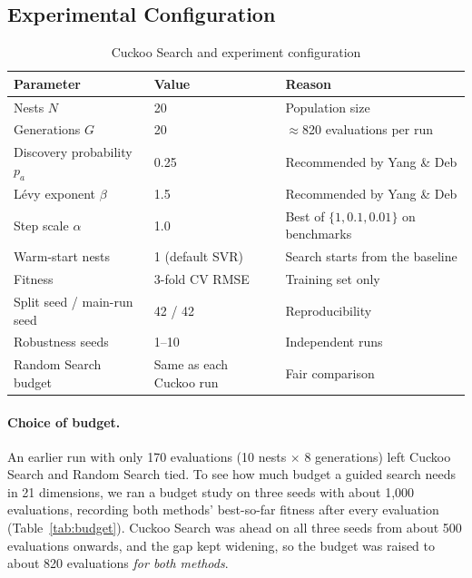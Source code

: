 \documentclass[12pt,a4paper]{article}
\numberwithin{equation}{section}
\numberwithin{table}{section}
\numberwithin{figure}{section}
\begin{document}
\subsection{Experimental Configuration}
\begin{table}[H]
\centering
\caption{Cuckoo Search and experiment configuration}
\label{tab:config}
\small
\begin{tabular}{@{}lll@{}}
\toprule
\textbf{Parameter} & \textbf{Value} & \textbf{Reason} \\ \midrule
Nests $N$ & 20 & Population size \\
Generations $G$ & 20 & $\approx$820 evaluations per run \\
Discovery probability $p_a$ & 0.25 & Recommended by Yang \& Deb \\
Lévy exponent $\beta$ & 1.5 & Recommended by Yang \& Deb \\
Step scale $\alpha$ & 1.0 & Best of $\{1, 0.1, 0.01\}$ on benchmarks \\
Warm-start nests & 1 (default SVR) & Search starts from the baseline \\
Fitness & 3-fold CV RMSE & Training set only \\
Split seed / main-run seed & 42 / 42 & Reproducibility \\
Robustness seeds & 1--10 & Independent runs \\
Random Search budget & Same as each Cuckoo run & Fair comparison \\ \bottomrule
\end{tabular}
\end{table}

\paragraph{Choice of budget.} An earlier run with only 170 evaluations (10 nests $\times$ 8 generations) left Cuckoo Search and Random Search tied. To see how much budget a guided search needs in 21 dimensions, we ran a budget study on three seeds with about 1,000 evaluations, recording both methods' best-so-far fitness after every evaluation (Table~\ref{tab:budget}). Cuckoo Search was ahead on all three seeds from about 500 evaluations onwards, and the gap kept widening, so the budget was raised to about 820 evaluations \emph{for both methods}.
\end{document}
